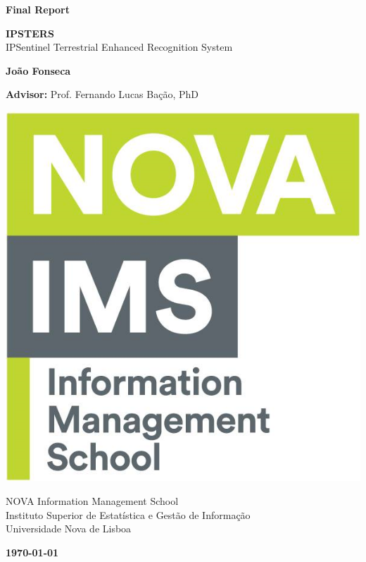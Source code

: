 \documentclass[12pt, english, openany]{book}
\begin{document}

\begin{titlepage}
  \clearpage\thispagestyle{empty}
  \centering
  \vspace{.5cm}

  {\large \textbf{Final Report} \par}
  \vspace{2.5cm}
  {\Huge \textbf{IPSTERS}} \\
  \vspace{1cm}
  {\Huge IPSentinel Terrestrial Enhanced Recognition System} \\
  \vspace{2.5cm}
  {\large \textbf{João Fonseca} \par}
  \vspace{.5cm}
  {\large \textbf{Advisor:} Prof. Fernando Lucas Bação, PhD \par}

  \vspace{1.5cm}
  \includegraphics[scale=0.2]{ims_logo.png}
  \vspace{1.3cm}

  {\normalsize NOVA Information Management School \\
    Instituto Superior de Estatística e Gestão de Informação \\
    Universidade Nova de Lisboa \par}

  \vspace{1.5cm}

  {\normalsize \textbf \today \par}
  \pagebreak
\end{titlepage}
\end{document}
